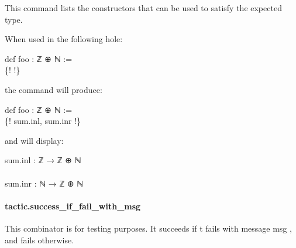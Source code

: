 \documentclass{article}
\begin{document}
\par
This command lists the constructors that can be used to satisfy the expected type.
\par
When used in the following hole:
\\
\colorbox[RGB]{253,246,227}{\parbox{4.5in}{{{{\color[RGB]{133, 153, 0} def }}}{{{\color[RGB]{101, 123, 131}   }}}{{{\color[RGB]{211, 54, 130} foo }}}{{{\color[RGB]{101, 123, 131}   }}}{{{\color[RGB]{101, 123, 131} : ℤ ⊕ ℕ  }}}{{{\color[RGB]{181, 137, 0} := }}}{{{\color[RGB]{101, 123, 131} 
 }}}\\
{{{\color[RGB]{101, 123, 131} \{! !\}
 }}}\\

}}\par
the command will produce:
\\
\colorbox[RGB]{253,246,227}{\parbox{4.5in}{{{{\color[RGB]{133, 153, 0} def }}}{{{\color[RGB]{101, 123, 131}   }}}{{{\color[RGB]{211, 54, 130} foo }}}{{{\color[RGB]{101, 123, 131}   }}}{{{\color[RGB]{101, 123, 131} : ℤ ⊕ ℕ  }}}{{{\color[RGB]{181, 137, 0} := }}}{{{\color[RGB]{101, 123, 131} 
 }}}\\
{{{\color[RGB]{101, 123, 131} \{! sum.inl, sum.inr !\}
 }}}\\

}}\par
and will display:
\\
\colorbox[RGB]{253,246,227}{\parbox{4.5in}{{{{\color[RGB]{101, 123, 131} sum.inl : ℤ  }}}{{{\color[RGB]{133, 153, 0} → }}}{{{\color[RGB]{101, 123, 131}  ℤ ⊕ ℕ
 }}}\\
{{{\color[RGB]{101, 123, 131} 
 }}}\\
{{{\color[RGB]{101, 123, 131} sum.inr : ℕ  }}}{{{\color[RGB]{133, 153, 0} → }}}{{{\color[RGB]{101, 123, 131}  ℤ ⊕ ℕ
 }}}\\

}}\paragraph{tactic.success\_if\_fail\_with\_msg}
\par
This combinator is for testing purposes. It succeeds if 
\colorbox[RGB]{253,246,227}{{{{\color[RGB]{101, 123, 131} t }}}} fails with message 
\colorbox[RGB]{253,246,227}{{{{\color[RGB]{101, 123, 131} msg }}}},
and fails otherwise.
\end{document}
